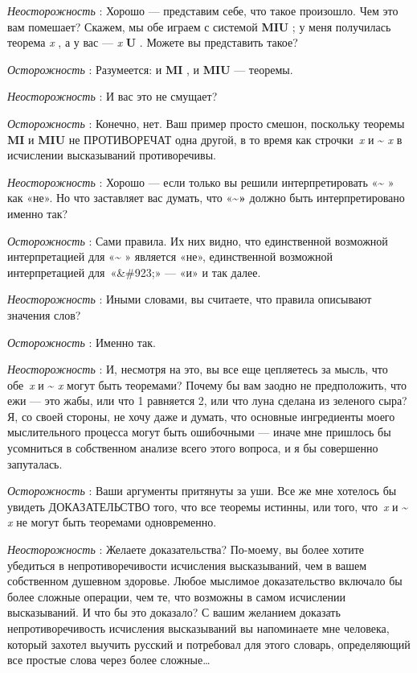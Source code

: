 \emph{Неосторожность} : Хорошо --- представим себе, что такое произошло. Чем это вам помешает? Скажем, мы обе играем с системой \textbf{MIU} ; у меня получилась теорема \emph{x} , а у вас --- \emph{x} \textbf{U} . Можете вы представить такое?

\emph{Осторожность} : Разумеется: и \textbf{MI} , и \textbf{MIU} --- теоремы.

\emph{Неосторожность} : И вас это не смущает?

\emph{Осторожность} : Конечно, нет. Ваш пример просто смешон, поскольку теоремы \textbf{MI} и \textbf{MIU} не ПРОТИВОРЕЧАТ одна другой, в то время как строчки~\emph{x} и \textbf{\textasciitilde{}} \emph{x} в исчислении высказываний противоречивы.

\emph{Неосторожность} : Хорошо --- если только вы решили интерпретировать «\textbf{\textasciitilde{}} » как «не». Но что заставляет вас думать, что «\textbf{\textasciitilde»} должно быть интерпретировано именно так?

\emph{Осторожность} : Сами правила. Их них видно, что единственной возможной интерпретацией для «\textbf{\textasciitilde{}} » является «не», единственной возможной интерпретацией для~«\&\#923;» --- «и» и так далее.

\emph{Неосторожность} : Иными словами, вы считаете, что правила описывают значения слов?

\emph{Осторожность} : Именно так.

\emph{Неосторожность} : И, несмотря на это, вы все еще цепляетесь за мысль, что обе~\emph{x} и \textbf{\textasciitilde{}} \emph{x} могут быть теоремами? Почему бы вам заодно не предположить, что ежи --- это жабы, или что 1 равняется 2, или что луна сделана из зеленого сыра? Я, со своей стороны, не хочу даже и думать, что основные ингредиенты моего мыслительного процесса могут быть ошибочными --- иначе мне пришлось бы усомниться в собственном анализе всего этого вопроса, и я бы совершенно запуталась.

\emph{Осторожность} : Ваши аргументы притянуты за уши. Все же мне хотелось бы увидеть ДОКАЗАТЕЛЬСТВО того, что все теоремы истинны, или того, что~\emph{x} и \textbf{\textasciitilde{}} \emph{x} не могут быть теоремами одновременно.

\emph{Неосторожность} : Желаете доказательства? По-моему, вы более хотите убедиться в непротиворечивости исчисления высказываний, чем в вашем собственном душевном здоровье. Любое мыслимое доказательство включало бы более сложные операции, чем те, что возможны в самом исчислении высказываний. И что бы это доказало? С вашим желанием доказать непротиворечивость исчисления высказываний вы напоминаете мне человека, который захотел выучить русский и потребовал для этого словарь, определяющий все простые слова через более сложные\ldots{}

